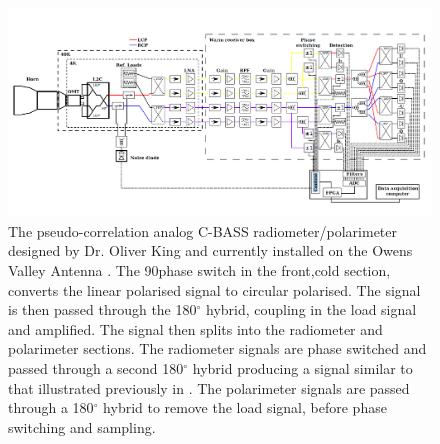 \begin{figure}
 \centering
 \includegraphics[width=\textwidth]{images/receiver_schematics/analogFull.png}
 \caption{The pseudo-correlation analog C-BASS radiometer/polarimeter designed by Dr. Oliver King and currently installed on the Owens Valley Antenna \protect \cite{King2009}. The 90\degt phase switch in the front,cold section, converts the linear polarised signal to circular polarised. The signal is then passed through the 180$^{\circ}$ hybrid, coupling in the load signal and amplified. The signal then splits into the radiometer and polarimeter sections. The radiometer signals are phase switched and passed through a second 180$^{\circ}$ hybrid producing a signal similar to that illustrated previously in . The polarimeter signals are passed through a 180$^{\circ}$ hybrid to remove the load signal, before phase switching and sampling.}
 \label{fig:analog_receiver}
\end{figure}

